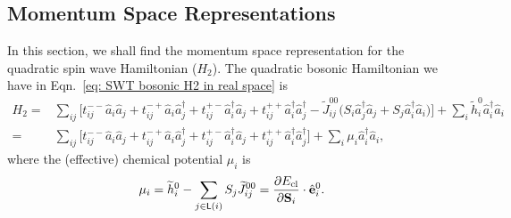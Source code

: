 \documentclass[aps, prx, nofootinbib, superscriptaddress]{revtex4-2}
\begin{document}
\subsection{Momentum Space Representations}

In this section, we shall find the momentum space representation for the quadratic spin wave Hamiltonian ($H_{2}$).
The quadratic bosonic Hamiltonian we have in Eqn.~\eqref{eq: SWT bosonic H2 in real space} is 
\begin{equation}
    \begin{split}
        H_{2} = & \sum_{ij}
        \Big[ t_{ij}^{--} \hat{a}_{i} \hat{a}_{j} + t_{ij}^{-+} \hat{a}_{i}\hat{a}_{j}^{\dagger} + t_{ij}^{+-} \hat{a}_{i}^{\dagger} \hat{a}_{j} + t_{ij}^{++} \hat{a}^{\dagger}_{i} \hat{a}^{\dagger}_{j} - \widetilde{J}_{ij}^{00} \big( S_{i} \hat{a}_{j}^{\dagger} \hat{a}_{j} + S_{j} \hat{a}_{i}^{\dagger} \hat{a}_{i} \big) \Big]  + \sum_{i} \widetilde{h}^{0}_{i} \hat{a}^{\dagger}_{i}\hat{a}_{i} \\
        = & \sum_{ij} 
        \Big[ t_{ij}^{--} \hat{a}_{i} \hat{a}_{j} + t_{ij}^{-+} \hat{a}_{i}\hat{a}_{j}^{\dagger} + t_{ij}^{+-} \hat{a}_{i}^{\dagger} \hat{a}_{j} + t_{ij}^{++} \hat{a}^{\dagger}_{i} \hat{a}^{\dagger}_{j} \Big] 
        + \sum_{i} \mu_{i} \hat{a}^{\dagger}_{i} \hat{a}_{i}, 
    \end{split}
\end{equation}
where the (effective) chemical potential $\mu_{i}$ is 
\begin{equation}
    \mu_{i} = \widetilde{h}^{0}_{i} - \sum_{j \in \mathsf{L}(i)} S_{j} \widetilde{J}^{00}_{ij} = \frac{\partial E_{\rm cl}}{\partial \mathbf{S}_{i}} \cdot \hat{\mathbf{e}}_{i}^{0}.
\end{equation}
\end{document}
